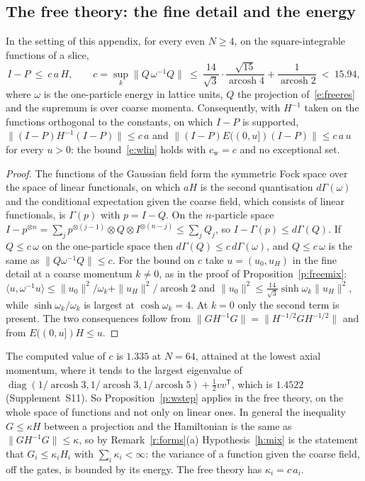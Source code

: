 \subsection*{The free theory: the fine detail and the energy}
\begin{proposition}\label{p:freeweight}
In the setting of this appendix, for every even $N\ge4$, on the square-integrable functions of a slice,
\[
I-P\ \le\ c\,a\,H,\qquad c=\sup_k\big\|Q\,\omega^{-1}Q\big\|\ \le\ \frac{14}{\sqrt3}\cdot\frac{\sqrt{15}}{\operatorname{arcosh}4}+\frac1{\operatorname{arcosh}2}\ <\ 15.94 ,
\]
where $\omega$ is the one-particle energy in lattice units, $Q$ the projection of~\eqref{e:freeres} and the
supremum is over coarse momenta. Consequently, with $H^{-1}$ taken on the functions orthogonal to the
constants, on which $I-P$ is supported, $\|(I-P)H^{-1}(I-P)\|\le c\,a$ and
$\|(I-P)E((0,u])(I-P)\|\le c\,a\,u$ for every $u>0$: the bound~\eqref{e:wlin} holds with $c_{\mathrm w}=c$ and
no exceptional set.
\end{proposition}
\begin{proof}
The functions of the Gaussian field form the symmetric Fock space over the space of linear functionals, on
which $aH$ is the second quantisation $d\Gamma(\omega)$ and the conditional expectation given the coarse
field, which consists of linear functionals, is $\Gamma(p)$ with $p=I-Q$. On the $n$-particle space
$I-p^{\otimes n}=\sum_jp^{\otimes(j-1)}\otimes Q\otimes I^{\otimes(n-j)}\le\sum_jQ_j$, so
$I-\Gamma(p)\le d\Gamma(Q)$. If $Q\le c\,\omega$ on the one-particle space then
$d\Gamma(Q)\le c\,d\Gamma(\omega)$, and $Q\le c\,\omega$ is the same as $\|Q\omega^{-1}Q\|\le c$. For the bound
on $c$ take $u=(u_0,u_H)$ in the fine detail at a coarse momentum $k\ne0$, as in the proof of
Proposition~\ref{p:freemix}: $\langle u,\omega^{-1}u\rangle\le\|u_0\|^2/\omega_k+\|u_H\|^2/\operatorname{arcosh}2$
and $\|u_0\|^2\le\tfrac{14}{\sqrt3}\sinh\omega_k\|u_H\|^2$, while $\sinh\omega_k/\omega_k$ is largest at
$\cosh\omega_k=4$. At $k=0$ only the second term is present. The two consequences follow from
$\|GH^{-1}G\|=\|H^{-1/2}GH^{-1/2}\|$ and from $E((0,u])H\le u$.
\end{proof}

The computed value of $c$ is $1.335$ at $N=64$, attained at the lowest axial momentum, where it tends to the
largest eigenvalue of
$\operatorname{diag}(1/\!\operatorname{arcosh}3,1/\!\operatorname{arcosh}3,1/\!\operatorname{arcosh}5)+\tfrac12vv^{\mathsf T}$,
which is $1.4522$ (Supplement~S11). So Proposition~\ref{p:wstep} applies in the free theory, on the whole
space of functions and not only on linear ones. In general the inequality $G\le\kappa H$ between a projection
and the Hamiltonian is the same as $\|GH^{-1}G\|\le\kappa$, so by Remark~\ref{r:forms}(a)
Hypothesis~\ref{h:mix} is the statement that $G_i\le\kappa_iH_i$ with $\sum_i\kappa_i<\infty$: the variance of
a function given the coarse field, off the gates, is bounded by its energy. The free theory has
$\kappa_i=c\,a_i$.

